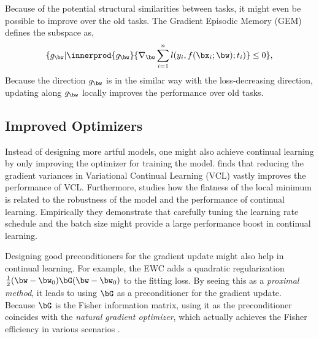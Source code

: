 Because of the potential structural similarities between tasks, it might even be possible to improve over the old tasks. The Gradient Episodic Memory (GEM) \citep{lopez2017gradient, chaudhry2018efficient}  defines the subspace as,
\begin{align}
    \{g_{\bw} | \innerprod{g_{\bw}}{\nabla_{\bw} \sum_{i=1}^n l(y_i, f(\bx_i; \bw); t_i)} \leq 0\},
\end{align}
Because the direction $g_{\bw}$ is in the similar way with the loss-decreasing direction,  updating along $g_{\bw}$ locally improves the performance over old tasks.

\subsection{Improved Optimizers}
Instead of designing more artful models, one might also achieve continual learning by only improving the optimizer for training the model. \citet{swaroop2019improving} finds that reducing the gradient variances in Variational Continual Learning (VCL) \citep{nguyen2017variational}  vastly improves the performance of VCL. Furthermore, \citet{mirzadeh2020understanding} studies how the flatness of the local minimum is related to the robustness of the model and the performance of continual learning. Empirically they demonstrate that carefully tuning the learning rate schedule and the batch size might provide a large performance boost in continual learning. 

Designing good preconditioners for the gradient update might also help in continual learning. For example, the EWC adds a quadratic regularization $\frac{1}{2}(\bw-\bw_0)\bG (\bw-\bw_0)$ to the fitting loss. By seeing this as a \emph{proximal method}, it leads to using $\bG$ as a preconditioner for the gradient update. Because $\bG$ is the Fisher information matrix, using it as the preconditioner coincides with the \emph{natural gradient optimizer}, which actually achieves the Fisher efficiency in various scenarios \citep{amari1998natural}.  




